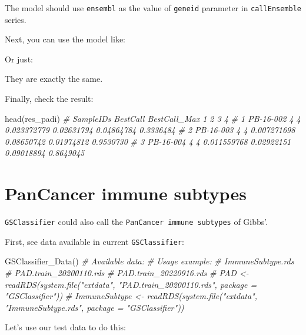 \documentclass[
  12pt,
]{book}
\newenvironment{Shaded}{\begin{snugshade}}{\end{snugshade}}
\newcommand{\CommentTok}[1]{\textcolor[rgb]{0.56,0.35,0.01}{\textit{#1}}}
\newcommand{\FunctionTok}[1]{\textcolor[rgb]{0.00,0.00,0.00}{#1}}
\newcommand{\NormalTok}[1]{#1}
\newcommand{\OtherTok}[1]{\textcolor[rgb]{0.56,0.35,0.01}{#1}}
\newcommand{\SpecialCharTok}[1]{\textcolor[rgb]{0.00,0.00,0.00}{#1}}
\begin{document}
The model should use \texttt{ensembl} as the value of \texttt{geneid} parameter in \texttt{callEnsemble} series.

Next, you can use the model like:

Or just:

They are exactly the same.

Finally, check the result:

\begin{Shaded}
\begin{Highlighting}[]
\FunctionTok{head}\NormalTok{(res\_padi)}
\CommentTok{\#   SampleIDs BestCall BestCall\_Max           1          2          3         4}
\CommentTok{\# 1 PB{-}16{-}002        4            4 0.023372779 0.02631794 0.04864784 0.3336484}
\CommentTok{\# 2 PB{-}16{-}003        4            4 0.007271698 0.08650742 0.01974812 0.9530730}
\CommentTok{\# 3 PB{-}16{-}004        4            4 0.011559768 0.02922151 0.09018894 0.8649045}
\end{Highlighting}
\end{Shaded}

\hypertarget{pancancer-immune-subtypes}{%
\section{PanCancer immune subtypes}\label{pancancer-immune-subtypes}}

\texttt{GSClassifier} could also call the \texttt{PanCancer\ immune\ subtypes} of Gibbs'.

First, see data available in current \texttt{GSClassifier}:

\begin{Shaded}
\begin{Highlighting}[]
\FunctionTok{GSClassifier\_Data}\NormalTok{()}
\CommentTok{\# Available data:}
\CommentTok{\# Usage example:}
\CommentTok{\#   ImmuneSubtype.rds }
\CommentTok{\#   PAD.train\_20200110.rds }
\CommentTok{\#   PAD.train\_20220916.rds }
\CommentTok{\#   PAD \textless{}{-} readRDS(system.file("extdata", "PAD.train\_20200110.rds", package = "GSClassifier")) }
\CommentTok{\#   ImmuneSubtype \textless{}{-} readRDS(system.file("extdata", "ImmuneSubtype.rds", package = "GSClassifier"))}
\end{Highlighting}
\end{Shaded}

Let's use our test data to do this:

\begin{Shaded}
\end{Shaded}
\end{document}
